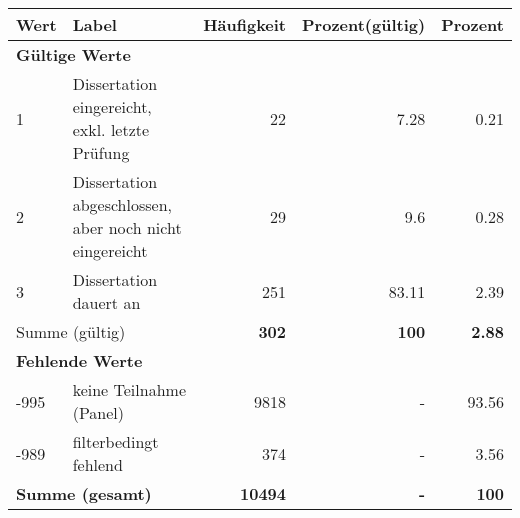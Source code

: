      \begin{longtable}{lXrrr}
     \toprule
     \textbf{Wert} & \textbf{Label} & \textbf{Häufigkeit} & \textbf{Prozent(gültig)} & \textbf{Prozent} \\
     \endhead
     \midrule
     \multicolumn{5}{l}{\textbf{Gültige Werte}}\\

     1 &
     \multicolumn{1}{X}{ Dissertation eingereicht, exkl. letzte Prüfung   } &


       \num{22} &
       \num[round-mode=places,round-precision=2]{7.28} &
         \num[round-mode=places,round-precision=2]{0.21} \\

     2 &
     \multicolumn{1}{X}{ Dissertation abgeschlossen, aber noch nicht eingereicht   } &


       \num{29} &
       \num[round-mode=places,round-precision=2]{9.6} &
         \num[round-mode=places,round-precision=2]{0.28} \\

     3 &
     \multicolumn{1}{X}{ Dissertation dauert an   } &


       \num{251} &
       \num[round-mode=places,round-precision=2]{83.11} &
         \num[round-mode=places,round-precision=2]{2.39} \\
     \midrule
     \multicolumn{2}{l}{Summe (gültig)} &
       \textbf{\num{302}} &
     \textbf{\num{100}} &
       \textbf{\num[round-mode=places,round-precision=2]{2.88}} \\
     \multicolumn{5}{l}{\textbf{Fehlende Werte}}\\
       -995 &
       keine Teilnahme (Panel) &
         \num{9818} &
        - &
         \num[round-mode=places,round-precision=2]{93.56} \\
       -989 &
       filterbedingt fehlend &
         \num{374} &
        - &
         \num[round-mode=places,round-precision=2]{3.56} \\
     \midrule
     \multicolumn{2}{l}{\textbf{Summe (gesamt)}} &
          \textbf{\num{10494}} &
        \textbf{-} &
        \textbf{\num{100}} \\
     \bottomrule
     \end{longtable}
     
